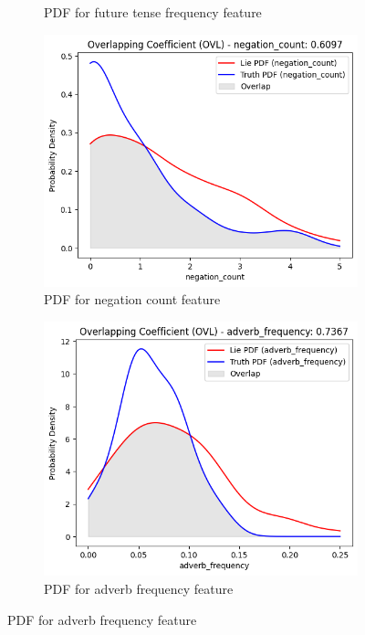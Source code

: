 \documentclass[12pt]{article}
\begin{document}
\begin{figure}[H]
\begin{subfigure}{0.5\textwidth}
        \caption{PDF for future tense frequency feature}
        \label{fig:2}
    \end{subfigure}

    \begin{subfigure}{0.5\textwidth}
        \includegraphics[width=\textwidth]{Figures/negation_count.png}
        \caption{PDF for negation count feature}
        \label{fig:3}
    \end{subfigure}%
    \begin{subfigure}{0.5\textwidth}
        \includegraphics[width=\textwidth]{Figures/adv_frequency.png}
        \caption{PDF for adverb frequency feature}
        \label{fig:4}
    \end{subfigure}


\end{figure}
\end{document}
